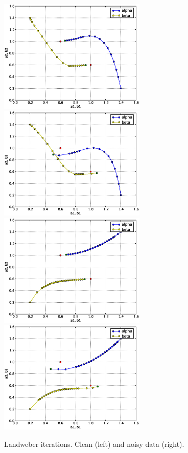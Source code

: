 \begin{figure}
\begin{center}
    \includegraphics[width=7cm]{chapters/schroll/eps/4Dscan3b.eps}
    \includegraphics[width=7cm]{chapters/schroll/eps/4Dscan3b-5.eps}
    \includegraphics[width=7cm]{chapters/schroll/eps/4Dscan4b.eps}
    \includegraphics[width=7cm]{chapters/schroll/eps/4Dscan4b-5.eps}
    \end{center}
    \vspace{-0.7cm}
  \caption{Landweber iterations. Clean (left) and noisy data (right). \label{fig4}}
\end{figure}

